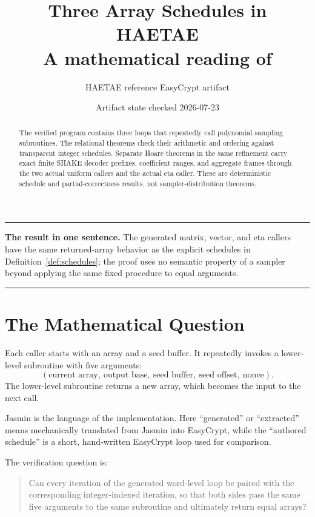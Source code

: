 \documentclass[11pt]{article}
\title{Three Array Schedules in HAETAE\\
\large A mathematical reading of \code{TargetKeygenSamplerCallers.ec}}
\author{HAETAE reference EasyCrypt artifact}
\date{Artifact state checked 2026-07-23}
\theoremstyle{definition}
\theoremstyle{plain}
\theoremstyle{remark}
\newenvironment{resultbox}
  {\begin{center}\begin{minipage}{0.94\linewidth}\color{artifactgreen}\hrule\vspace{0.6em}\color{black}}
  {\vspace{0.6em}\color{artifactgreen}\hrule\end{minipage}\end{center}}
\begin{document}
\maketitle

\begin{abstract}
The verified program contains three loops that repeatedly call polynomial
sampling subroutines.  The relational theorems check their arithmetic and
ordering against transparent integer schedules.  Separate Hoare theorems in
the same refinement carry exact finite SHAKE decoder prefixes, coefficient
ranges, and aggregate frames through the two actual uniform callers and the
actual eta caller.  These are deterministic schedule and partial-correctness
results, not sampler-distribution theorems.
\end{abstract}

\begin{resultbox}
\textbf{The result in one sentence.}
The generated matrix, vector, and eta callers have the same returned-array
behavior as the explicit schedules in Definition~\ref{def:schedules}; the
proof uses no semantic property of a sampler beyond applying the same fixed
procedure to equal arguments.
\end{resultbox}

\section{The Mathematical Question}

Each caller starts with an array and a seed buffer.  It repeatedly invokes a
lower-level subroutine with five arguments:
\[
  (\text{current array},\ \text{output base},\ \text{seed buffer},\
    \text{seed offset},\ \text{nonce}).
\]
The lower-level subroutine returns a new array, which becomes the input to the
next call.

Jasmin is the language of the implementation.  Here ``generated'' or
``extracted'' means mechanically translated from Jasmin into EasyCrypt, while
the ``authored schedule'' is a short, hand-written EasyCrypt loop used for
comparison.

The verification question is:

\begin{quote}
Can every iteration of the generated word-level loop be paired with the
corresponding integer-indexed iteration, so that both sides pass the same five
arguments to the same subroutine and ultimately return equal arrays?
\end{quote}
\end{document}
